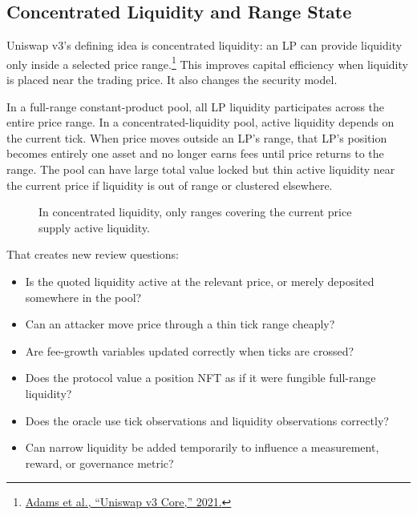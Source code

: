 \subsection{Concentrated Liquidity and Range State}

Uniswap v3's defining idea is concentrated liquidity: an LP can provide liquidity only inside a selected price range.\footnote{\href{https://app.uniswap.org/whitepaper-v3.pdf}{Adams et al., ``Uniswap v3 Core,'' 2021.}} This improves capital efficiency when liquidity is placed near the trading price. It also changes the security model.

In a full-range constant-product pool, all LP liquidity participates across the entire price range. In a concentrated-liquidity pool, active liquidity depends on the current tick. When price moves outside an LP's range, that LP's position becomes entirely one asset and no longer earns fees until price returns to the range. The pool can have large total value locked but thin active liquidity near the current price if liquidity is out of range or clustered elsewhere.

\begin{figure}[htbp]
\centering
{}
\caption{In concentrated liquidity, only ranges covering the current price supply active liquidity.}
\end{figure}

That creates new review questions:

\begin{itemize}
\item Is the quoted liquidity active at the relevant price, or merely deposited somewhere in the pool?
\item Can an attacker move price through a thin tick range cheaply?
\item Are fee-growth variables updated correctly when ticks are crossed?
\item Does the protocol value a position NFT as if it were fungible full-range liquidity?
\item Does the oracle use tick observations and liquidity observations correctly?
\item Can narrow liquidity be added temporarily to influence a measurement, reward, or governance metric?
\end{itemize}

